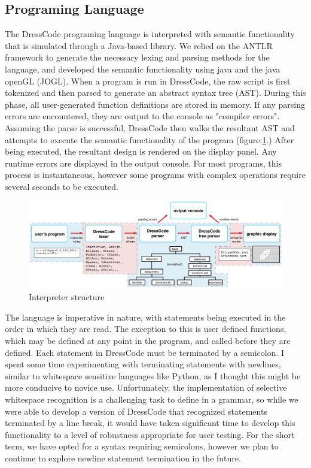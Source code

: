 \subsection{Programing Language}
The DressCode programing language is interpreted with semantic functionality that is simulated through a Java-based library.  We relied on the ANTLR framework to generate the necessary lexing and parsing methods for the language, and developed the semantic functionality using java and the java openGL (JOGL). When a program is run in DressCode, the raw script is first tokenized and then parsed to generate an abstract syntax tree (AST). During this phase, all user-generated function definitions are stored in memory. If any parsing errors are encountered, they are output to the console as "compiler errors". Assuming the parse is successful, DressCode then walks the resultant AST and attempts to execute the semantic functionality of the program (figure:\ref{fig:interpreter_structure}.) After being executed, the resultant design is rendered on the display panel. Any runtime errors are displayed in the output console. For most programs, this process is instantaneous, however some programs with complex operations require several seconds to be executed. 
  \begin{center}
\begin{figure}[h!]
\includegraphics[width=6.5in]{images/interpreter_structure_horz.png}
\caption{Interpreter structure}
\label{fig:interpreter_structure}
\end{figure}
\end{center}
The language is imperative in nature, with statements being executed in the order in which they are read. The exception to this is user defined functions, which may be defined at any point in the program, and called before they are defined. Each statement in DressCode must be terminated by a semicolon. I spent some time experimenting with terminating statements with newlines, similar to whitespace sensitive languages like Python, as I thought this might be more conducive to novice use. Unfortunately, the implementation of selective whitespace recognition is a challenging task to define in a grammar, so while we were able to develop a version of DressCode that recognized statements terminated by a line break, it would have taken significant time to develop this functionality to a level of robustness appropriate for user testing. For the short term, we have opted for a syntax requiring semicolons, however we plan to continue to explore newline statement termination in the future. 

